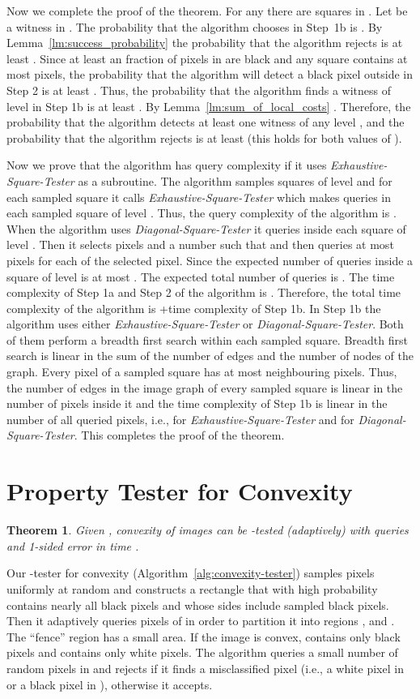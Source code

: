\documentclass[11pt,english]{article}
\newtheorem{theorem}{Theorem}[section]
\numberwithin{figure}{section}
\begin{document}
Now we complete the proof of the theorem. For any  there are
 squares in . Let  be a witness in .
The probability that the algorithm chooses  in Step~1b is
.
By Lemma~\ref{lm:success_probability} the probability that the algorithm rejects
 is at least . Since at least an 
fraction of pixels in  are black and any square contains at most
 pixels, the probability that the
algorithm will detect a black pixel outside  in Step 2 is at least
.
Thus, the probability that the algorithm finds a witness of level  in Step 1b
is at least .
By Lemma~\ref{lm:sum_of_local_costs} . Therefore, the probability that the algorithm detects at
least one witness of any level , and the probability
that the algorithm rejects  is at least 
(this holds for both values of ).


Now we prove that the algorithm has query
complexity  if it uses \emph{Exhaustive-Square-Tester}
as a subroutine.
The algorithm samples  squares of level
 and for each sampled square it calls
\emph{Exhaustive-Square-Tester} which makes
 queries in each sampled square of level .
Thus, the query complexity of the algorithm is .
When the algorithm uses \emph{Diagonal-Square-Tester} it queries
 inside each square of
level . Then it selects  pixels and a number
 such that  and then queries at
most  pixels for each of the selected pixel. Since  the
expected number of queries inside a square of level  is at most
. The expected total number of queries is
. The time
complexity of Step 1a and Step 2 of the algorithm is .
Therefore, the total time complexity of the algorithm is
+time complexity of Step 1b. In Step 1b the algorithm
uses either \emph{Exhaustive-Square-Tester} or \emph{Diagonal-Square-Tester}. Both of them perform a breadth first search within each sampled square.
Breadth first search is linear in the sum of the number of edges and the number of nodes of the graph.
Every pixel of a sampled square has at most  neighbouring pixels.
Thus, the number of edges in the image graph of every sampled square is linear in the number of pixels inside it and the time complexity of
Step 1b is linear in the number of all queried pixels, i.e.,
 for \emph{Exhaustive-Square-Tester} and
 for
\emph{Diagonal-Square-Tester}. This completes the proof of the theorem.
\section{Property Tester for Convexity}\label{sec:convexity-tester}
\begin{theorem}\label{thm:convexity-tester}
Given , convexity of  images can be -tested
(adaptively) with  queries and 1-sided error in time
.
\end{theorem}
Our -tester for convexity (Algorithm~\ref{alg:convexity-tester})
samples pixels uniformly at random and constructs a rectangle  that with high probability contains nearly all black pixels and whose sides include sampled black pixels.
Then it adaptively queries pixels of  in order to partition it into regions , 
and . The ``fence'' region  has a small area. If the image is convex,  contains only black pixels and  contains
only white pixels.  The algorithm queries a small number of random pixels in  and rejects
if it finds a misclassified pixel (i.e., a white pixel in  or
a black pixel in ), otherwise it accepts.
\end{document}
